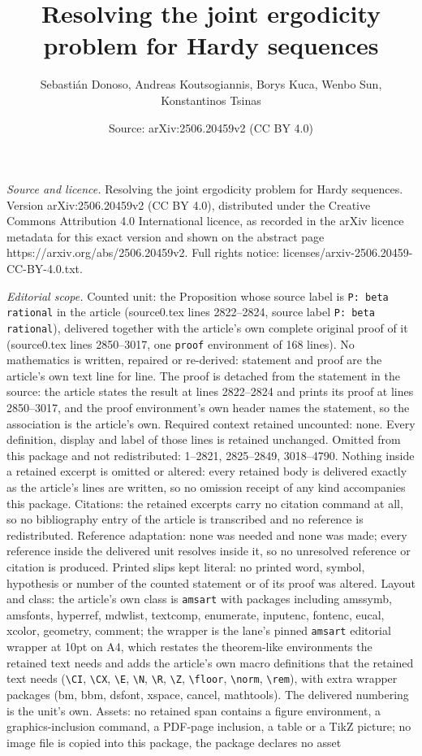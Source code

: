\documentclass[10pt,a4paper]{amsart}
\title[Resolving the joint ergodicity problem for Hardy sequences]{Resolving the joint ergodicity problem for Hardy sequences}
\author{Sebasti\'an Donoso, Andreas Koutsogiannis, Borys Kuca, Wenbo Sun, Konstantinos Tsinas}
\date{Source: arXiv:2506.20459v2 (CC BY 4.0)}
\begin{document}
\maketitle

\noindent\emph{Source and licence.} Resolving the joint ergodicity problem for Hardy sequences. Version arXiv:2506.20459v2 (CC BY 4.0), distributed under the Creative Commons Attribution 4.0 International licence, as recorded in the arXiv licence metadata for this exact version and shown on the abstract page https://arxiv.org/abs/2506.20459v2. Full rights notice: licenses/arxiv-2506.20459-CC-BY-4.0.txt.\par\smallskip

\noindent\textit{Editorial scope.} Counted unit: the Proposition whose source label is \texttt{P: beta rational} in the article (source0.tex lines 2822--2824, source label \texttt{P: beta rational}), delivered together with the article's own complete original proof of it (source0.tex lines 2850--3017, one \texttt{proof} environment of 168 lines). No mathematics is written, repaired or re-derived: statement and proof are the article's own text line for line. The proof is detached from the statement in the source: the article states the result at lines 2822--2824 and prints its proof at lines 2850--3017, and the proof environment's own header names the statement, so the association is the article's own. Required context retained uncounted: none. Every definition, display and label of those lines is retained unchanged. Omitted from this package and not redistributed: 1--2821, 2825--2849, 3018--4790. Nothing inside a retained excerpt is omitted or altered: every retained body is delivered exactly as the article's lines are written, so no omission receipt of any kind accompanies this package. Citations: the retained excerpts carry no citation command at all, so no bibliography entry of the article is transcribed and no reference is redistributed. Reference adaptation: none was needed and none was made; every reference inside the delivered unit resolves inside it, so no unresolved reference or citation is produced. Printed slips kept literal: no printed word, symbol, hypothesis or number of the counted statement or of its proof was altered. Layout and class: the article's own class is \texttt{amsart} with packages including amssymb, amsfonts, hyperref, mdwlist, textcomp, enumerate, inputenc, fontenc, eucal, xcolor, geometry, comment; the wrapper is the lane's pinned \texttt{amsart} editorial wrapper at 10pt on A4, which restates the theorem-like environments the retained text needs and adds the article's own macro definitions that the retained text needs (\texttt{\textbackslash CI}, \texttt{\textbackslash CX}, \texttt{\textbackslash E}, \texttt{\textbackslash N}, \texttt{\textbackslash R}, \texttt{\textbackslash Z}, \texttt{\textbackslash floor}, \texttt{\textbackslash norm}, \texttt{\textbackslash rem}), with extra wrapper packages (bm, bbm, dsfont, xspace, cancel, mathtools). The delivered numbering is the unit's own. Assets: no retained span contains a figure environment, a graphics-inclusion command, a PDF-page inclusion, a table or a TikZ picture; no image file is copied into this package, the package declares no asset 
\end{document}
